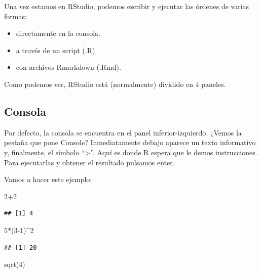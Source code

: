\documentclass[
]{book}
\newenvironment{Shaded}{\begin{snugshade}}{\end{snugshade}}
\newcommand{\DecValTok}[1]{\textcolor[rgb]{0.00,0.00,0.81}{#1}}
\newcommand{\FunctionTok}[1]{\textcolor[rgb]{0.00,0.00,0.00}{#1}}
\newcommand{\NormalTok}[1]{#1}
\newcommand{\SpecialCharTok}[1]{\textcolor[rgb]{0.00,0.00,0.00}{#1}}
\begin{document}
Una vez estamos en RStudio, podemos escribir y ejecutar las órdenes de varias formas:

\begin{itemize}
\item
  directamente en la consola.
\item
  a través de un script (.R).
\item
  con archivos Rmarkdown (.Rmd).
\end{itemize}

Como podemos ver, RStudio está (normalmente) dividido en 4 paneles.

\hypertarget{consola}{%
\subsection{Consola}\label{consola}}

Por defecto, la consola se encuentra en el panel inferior-izquierdo. ¿Vemos la pestaña que pone Console? Inmediatamente debajo aparece un texto informativo y, finalmente, el símbolo ``\textgreater{}''. Aquí es donde R espera que le demos instrucciones. Para ejecutarlas y obtener el resultado pulsamos enter.

Vamos a hacer este ejemplo:

\begin{Shaded}
\begin{Highlighting}[]
\DecValTok{2}\SpecialCharTok{+}\DecValTok{2}
\end{Highlighting}
\end{Shaded}

\begin{verbatim}
## [1] 4
\end{verbatim}

\begin{Shaded}
\begin{Highlighting}[]
\DecValTok{5}\SpecialCharTok{*}\NormalTok{(}\DecValTok{3{-}1}\NormalTok{)}\SpecialCharTok{\^{}}\DecValTok{2}
\end{Highlighting}
\end{Shaded}

\begin{verbatim}
## [1] 20
\end{verbatim}

\begin{Shaded}
\begin{Highlighting}[]
\FunctionTok{sqrt}\NormalTok{(}\DecValTok{4}\NormalTok{)}
\end{Highlighting}
\end{Shaded}
\end{document}
